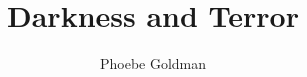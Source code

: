 \title{Darkness and Terror}
\author{Phoebe Goldman}
\date{}

\newcommand{\theprof}{Profs. Robert Young and Arvind Rajagopal}
\newcommand{\theclass}{Cold War Humanism}
